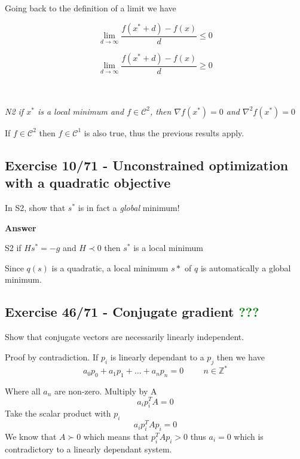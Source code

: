 Going back to the definition of a limit we have

\begin{minipage}[t]{.5\textwidth}
  \[
  	\lim_{d\to\infty} \frac{f(x^* + d) - f(x)}{d} \leq 0
  \]
\end{minipage}
\hspace{0.025\textwidth}\vline\hspace{0.025\textwidth}
\begin{minipage}[t]{.5\textwidth}
  \[
  	\lim_{d\to\infty} \frac{f(x^* + d) - f(x)}{d} \geq 0
  \]
\end{minipage}
\\
\\

\hspace{0.5in} \textit{N2 if $x^*$ is a local minimum and $f \in \mathcal{C}^2$, then $\nabla f(x^*) = 0$ and $\nabla^2 f(x^*) = 0$}

If $f \in \mathcal{C}^2$ then $f \in \mathcal{C}^1$ is also true, thus the previous results apply.

\incomplete

\subsection{Exercise 10/71 - Unconstrained optimization with a quadratic objective}
In S2, show that $s^*$ is in fact a \textit{global} minimum!

\textbf{Answer}

\hspace{0.5in} S2 if $Hs^* = -g$ and $H \prec 0$ then $s^*$ is a local minimum

Since $q(s)$ is a quadratic, a local minimum $s*$ of $q$ is automatically a global minimum.

\subsection{Exercise 46/71 - Conjugate gradient \textcolor{green}{???}}
Show that conjugate vectors are necessarily linearly independent.

\answer

Proof by contradiction. If $p_i$ is linearly dependant to a $p_j$ then we have
\[
	a_0 p_0 + a_1 p_1 + \ldots + a_n p_n = 0 \hspace{1cm} n \in \mathbb{Z^*}
\]

Where all $a_n$ are non-zero. Multiply by A
\[
	a_i p_i^T A= 0
\] 
Take the scalar product with $p_i$
\[
	a_i p_i^T A p_i = 0
\]
We know that $A \succ 0$ which means that $p_i^T A p_i > 0$ thus $a_i = 0$ which is contradictory to a linearly dependant system.


